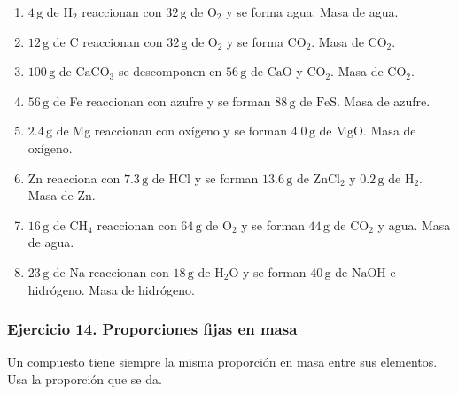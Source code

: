 \begin{enumerate}
    \item[a)] $4\,\mathrm{g}$ de $\mathrm{H_2}$ reaccionan con
    $32\,\mathrm{g}$ de $\mathrm{O_2}$ y se forma agua.
    Masa de agua.

    \item[b)] $12\,\mathrm{g}$ de C reaccionan con
    $32\,\mathrm{g}$ de $\mathrm{O_2}$ y se forma $\mathrm{CO_2}$.
    Masa de $\mathrm{CO_2}$.

    \item[c)] $100\,\mathrm{g}$ de $\mathrm{CaCO_3}$ se descomponen en
    $56\,\mathrm{g}$ de $\mathrm{CaO}$ y $\mathrm{CO_2}$.
    Masa de $\mathrm{CO_2}$.

    \item[d)] $56\,\mathrm{g}$ de Fe reaccionan con azufre
    y se forman $88\,\mathrm{g}$ de $\mathrm{FeS}$.
    Masa de azufre.

    \item[e)] $2.4\,\mathrm{g}$ de Mg reaccionan con oxígeno
    y se forman $4.0\,\mathrm{g}$ de $\mathrm{MgO}$.
    Masa de oxígeno.

    \item[f)] Zn reacciona con $7.3\,\mathrm{g}$ de $\mathrm{HCl}$
    y se forman $13.6\,\mathrm{g}$ de $\mathrm{ZnCl_2}$
    y $0.2\,\mathrm{g}$ de $\mathrm{H_2}$.
    Masa de Zn.

    \item[g)] $16\,\mathrm{g}$ de $\mathrm{CH_4}$ reaccionan con
    $64\,\mathrm{g}$ de $\mathrm{O_2}$ y se forman
    $44\,\mathrm{g}$ de $\mathrm{CO_2}$ y agua.
    Masa de agua.

    \item[h)] $23\,\mathrm{g}$ de Na reaccionan con
    $18\,\mathrm{g}$ de $\mathrm{H_2O}$ y se forman
    $40\,\mathrm{g}$ de $\mathrm{NaOH}$ e hidrógeno.
    Masa de hidrógeno.
\end{enumerate}

\subsubsection*{Ejercicio 14. Proporciones fijas en masa}

Un compuesto tiene siempre la misma proporción en masa entre sus elementos.
Usa la proporción que se da.

